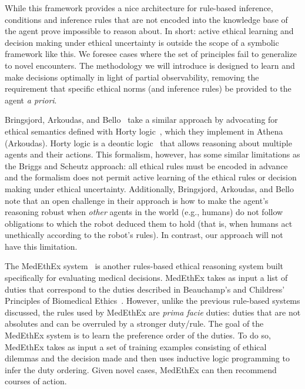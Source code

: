 \documentclass[11pt]{article}
\begin{document}
While this framework provides a nice architecture for rule-based inference, conditions and inference rules that are not encoded into the knowledge base of the agent prove impossible to reason about. In short: active ethical learning and decision making under ethical uncertainty is outside the scope of a symbolic framework like this. We foresee cases where the set of principles fail to generalize to novel encounters. The methodology we will introduce is designed to learn and make decisions optimally in light of partial observability, removing the requirement that specific ethical norms (and inference rules) be provided to the agent {\it a priori}.

Bringsjord, Arkoudas, and Bello~ take a similar approach by advocating for ethical semantics defined with Horty logic~\cite{horty2001agency,murakami2004utilitarian}, which they implement in Athena %
 (Arkoudas).
Horty logic is a deontic logic~\cite{clarke1975logical} that allows reasoning about multiple agents and their actions. This formalism, however, has some similar limitations as the Briggs and Scheutz approach: all ethical rules must be encoded in advance and the formalism does not permit active learning of the ethical rules or decision making under ethical uncertainty. Additionally, Bringsjord, Arkoudas, and Bello note that an open challenge in their approach is how to make the agent's reasoning robust when {\em other} agents in the world (e.g., humans) do not follow obligations to which the robot deduced them to hold (that is, when humans act unethically according to the robot's rules). In contrast, our approach will not have this limitation.

The MedEthEx system~\cite{anderson2006medethex} is another rules-based ethical reasoning system built specifically for evaluating medical decisions. MedEthEx takes as input a list of duties that correspond to the duties described in Beauchamp's and Childress' Principles of Biomedical Ethics~. However, unlike the previous rule-based systems discussed, the rules used by MedEthEx are {\em prima facie} duties: duties that are not absolutes and can be overruled by a stronger duty/rule. The goal of the MedEthEx system is to learn the preference order of the duties. To do so, MedEthEx takes as input a set of training examples consisting of ethical dilemmas and the decision made and then uses inductive logic programming to infer the duty ordering. Given novel cases, MedEthEx can then recommend courses of action.
\end{document}
